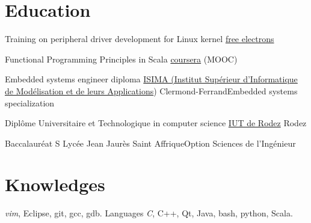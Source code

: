 \documentclass[10pt,a4paper,sans]{moderncv}
\begin{document}



\section{Education}
	{Training on peripheral driver development for Linux kernel}
	{\href{http://free-electrons.com/}{free electrons}}
	{}{}{}
	
	{Functional Programming Principles in Scala}
	{\href{https://fr.coursera.org/course/progfun}{coursera}}
	{(MOOC)}{}{}

	{Embedded systems engineer diploma}
	{\href{http://www.isima.fr/}{ISIMA (Institut Supérieur d’Informatique de Modélisation et de leurs Applications})}
	{Clermond-Ferrand}{Embedded systems specialization}{}

	{Diplôme Universitaire et Technologique in computer science}
	{\href{http://www.iut-rodez.fr/}{IUT de Rodez}}
	{Rodez}{}{}

	{Baccalauréat S}
	{Lycée Jean Jaurès}
	{Saint Affrique}{Option Sciences de l'Ingénieur}{}


\section{Knowledges}
								{\emph{vim}, Eclipse, git, gcc, gdb.}
							{Languages}
								{\emph{C}, C++, Qt, Java, bash, python, Scala.}
\end{document}
